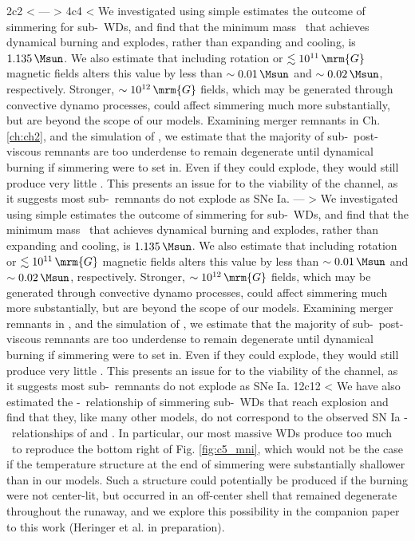 2c2
< \label{ssec:c5_conclusions}
---
> \label{ssec:conclusions}
4c4
< We investigated using simple estimates the outcome of simmering for sub-\Mch\ WDs, and find that the minimum mass \Mcrit\ that achieves dynamical burning and explodes, rather than expanding and cooling, is $1.135\,\Msun$.  We also estimate that including rotation or $\lesssim 10^{11}\,\mrm{G}$ magnetic fields alters this value by less than $\sim0.01\,\Msun$ and $\sim0.02\,\Msun$, respectively.  Stronger, $\sim10^{12}\,\mrm{G}$ fields, which may be generated through convective dynamo processes, could affect simmering much more substantially, but are beyond the scope of our models.  Examining merger remnants in Ch. \ref{ch:ch2}, and the simulation of \cite{ji+13}, we estimate that the majority of sub-\Mch\ post-viscous remnants are too underdense to remain degenerate until dynamical burning if simmering were to set in.  Even if they could explode, they would still produce very little \Ni.  This presents an issue for to the viability of the \citeal{vkercj10} channel, as it suggests most sub-\Mch\ remnants do not explode as SNe Ia.
---
> We investigated using simple estimates the outcome of simmering for sub-\Mch\ WDs, and find that the minimum mass \Mcrit\ that achieves dynamical burning and explodes, rather than expanding and cooling, is $1.135\,\Msun$.  We also estimate that including rotation or $\lesssim 10^{11}\,\mrm{G}$ magnetic fields alters this value by less than $\sim0.01\,\Msun$ and $\sim0.02\,\Msun$, respectively.  Stronger, $\sim10^{12}\,\mrm{G}$ fields, which may be generated through convective dynamo processes, could affect simmering much more substantially, but are beyond the scope of our models.  Examining merger remnants in \citeal{zhu+13}, and the simulation of \cite{ji+13}, we estimate that the majority of sub-\Mch\ post-viscous remnants are too underdense to remain degenerate until dynamical burning if simmering were to set in.  Even if they could explode, they would still produce very little \Ni.  This presents an issue for to the viability of the \citeal{vkercj10} channel, as it suggests most sub-\Mch\ remnants do not explode as SNe Ia.
12c12
< We have also estimated the \Mtot-\MNi\ relationship of simmering sub-\Mch\ WDs that reach explosion and find that they, like many other models, do not correspond to the observed SN Ia \Mtot-\MNi\ relationships of \cite{scalzrs14} and \cite{chil+15}.  In particular, our most massive WDs produce too much \Ni\ to reproduce the bottom right of Fig. \ref{fig:c5_mni}, which would not be the case if the temperature structure at the end of simmering were substantially shallower than in our models.  Such a structure could potentially be produced if the burning were not center-lit, but occurred in an off-center shell that remained degenerate throughout the runaway, and we explore this possibility in the companion paper to this work (Heringer et al. in preparation).
